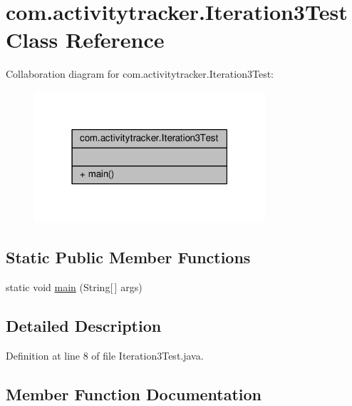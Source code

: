 \hypertarget{classcom_1_1activitytracker_1_1_iteration3_test}{}\section{com.\+activitytracker.\+Iteration3\+Test Class Reference}
\label{classcom_1_1activitytracker_1_1_iteration3_test}


Collaboration diagram for com.\+activitytracker.\+Iteration3\+Test\+:
\nopagebreak
\begin{figure}[H]
\begin{center}
\leavevmode
\includegraphics[width=243pt]{classcom_1_1activitytracker_1_1_iteration3_test__coll__graph}
\end{center}
\end{figure}
\subsection*{Static Public Member Functions}
\begin{DoxyCompactItemize}
\item 
static void \hyperlink{classcom_1_1activitytracker_1_1_iteration3_test_a54f41d79b383667b8f79258dbfd7771c}{main} (String\mbox{[}$\,$\mbox{]} args)
\end{DoxyCompactItemize}


\subsection{Detailed Description}


Definition at line 8 of file Iteration3\+Test.\+java.



\subsection{Member Function Documentation}
